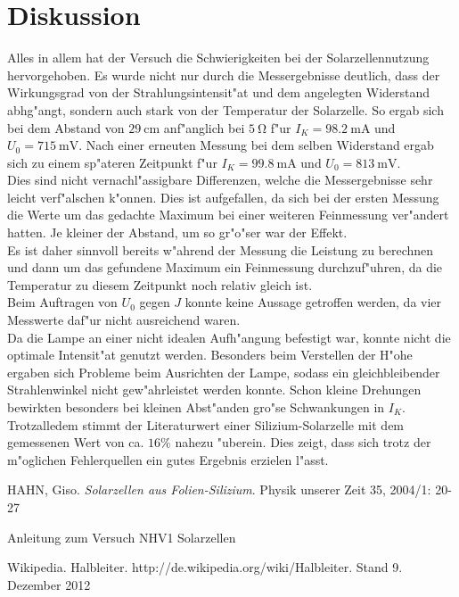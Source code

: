 \newpage
\section{Diskussion}
	\label{sec:diskussion}

	Alles in allem hat der Versuch die Schwierigkeiten bei der Solarzellennutzung hervorgehoben.
	Es wurde nicht nur durch die Messergebnisse deutlich, dass der Wirkungsgrad von der Strahlungsintensit"at und dem angelegten Widerstand abhg"angt, sondern auch stark von der Temperatur der Solarzelle.
	So ergab sich bei dem Abstand von $\SI{29}{\centi\meter}$ anf"anglich bei $\SI{5}{\ohm}$ f"ur $I_K = \SI{98.2}{\milli\ampere}$ und $U_0 = \SI{715}{\milli\volt}$.
	Nach einer erneuten Messung bei dem selben Widerstand ergab sich zu einem sp"ateren Zeitpunkt f"ur $I_K = \SI{99.8}{\milli\ampere}$ und $U_0 = \SI{813}{\milli\volt}$.\\ 
	Dies sind nicht vernachl"assigbare Differenzen, welche die Messergebnisse sehr leicht verf"alschen k"onnen.
	Dies ist aufgefallen, da sich bei der ersten Messung die Werte um das gedachte Maximum bei einer weiteren Feinmessung ver"andert hatten.
	Je kleiner der Abstand, um so gr"o"ser war der Effekt.\\
	Es ist daher sinnvoll bereits w"ahrend der Messung die Leistung zu berechnen und dann um das gefundene Maximum ein Feinmessung durchzuf"uhren, da die Temperatur zu diesem Zeitpunkt noch relativ gleich ist.\\
	Beim Auftragen von $U_0$ gegen $J$ konnte keine Aussage getroffen werden, da vier Messwerte daf"ur nicht ausreichend waren.\\
	Da die Lampe an einer nicht idealen Aufh"angung befestigt war, konnte nicht die optimale Intensit"at genutzt werden.
	Besonders beim Verstellen der H"ohe ergaben sich Probleme beim Ausrichten der Lampe, sodass ein gleichbleibender Strahlenwinkel nicht gew"ahrleistet werden konnte.
	Schon kleine Drehungen bewirkten besonders bei kleinen Abst"anden gro"se Schwankungen in $I_K$.\\
	Trotzalledem stimmt der Literaturwert einer Silizium-Solarzelle  mit dem gemessenen Wert von ca. $16\%$ nahezu "uberein.
	Dies zeigt, dass sich trotz der m"oglichen Fehlerquellen ein gutes Ergebnis erzielen l"asst.

\begin{thebibliography}{9}
	 HAHN, Giso. \emph{Solarzellen aus Folien-Silizium}. Physik unserer Zeit 35, 2004/1: 20-27

	 Anleitung zum Versuch NHV1 Solarzellen

	 Wikipedia. Halbleiter. http://de.wikipedia.org/wiki/Halbleiter. Stand 9. Dezember 2012
\end{thebibliography}